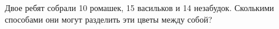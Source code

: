 \question
Двое ребят собрали 10 ромашек, 15 васильков и 14 незабудок. Сколькими способами они могут разделить эти цветы между собой?

